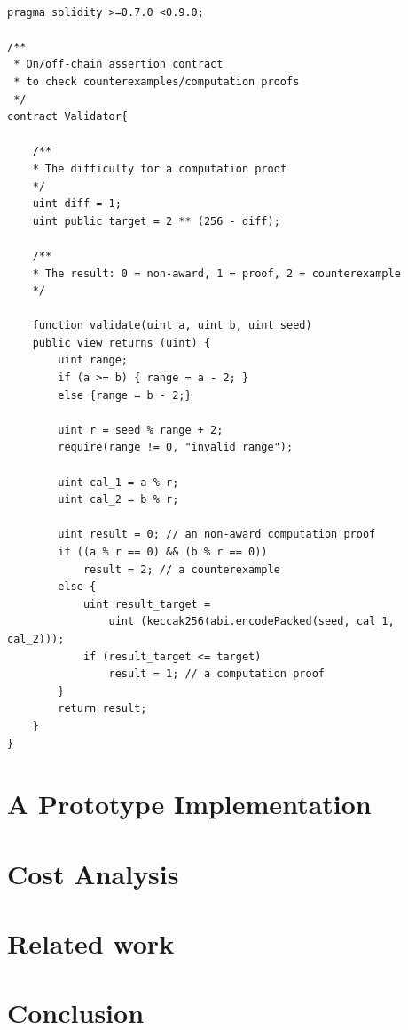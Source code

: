 \documentclass[runningheads]{llncs}
\begin{document}
\begin{lstlisting}[numbers=none]

pragma solidity >=0.7.0 <0.9.0;

/**
 * On/off-chain assertion contract 
 * to check counterexamples/computation proofs
 */
contract Validator{

    /**
    * The difficulty for a computation proof
    */
    uint diff = 1;
    uint public target = 2 ** (256 - diff); 

    /**
    * The result: 0 = non-award, 1 = proof, 2 = counterexample
    */

    function validate(uint a, uint b, uint seed)
    public view returns (uint) {
        uint range;
        if (a >= b) { range = a - 2; }
        else {range = b - 2;}
        
        uint r = seed % range + 2;
        require(range != 0, "invalid range");

        uint cal_1 = a % r;
        uint cal_2 = b % r;

        uint result = 0; // an non-award computation proof 
        if ((a % r == 0) && (b % r == 0))  
            result = 2; // a counterexample
        else {
            uint result_target = 
                uint (keccak256(abi.encodePacked(seed, cal_1, cal_2)));
            if (result_target <= target) 
                result = 1; // a computation proof      
        }              
        return result;           
    }
}

\end{lstlisting}

\section{A Prototype Implementation}
\section{Cost Analysis}
\section{Related work}
\section{Conclusion}

\newpage
{}


\newpage


\end{document}
